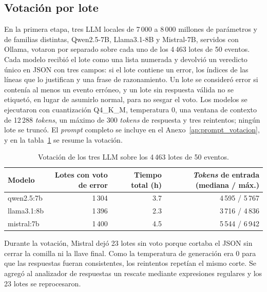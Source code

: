 
\subsection{Votación por lote}\label{subsec:met_votacion}

En la primera etapa, tres LLM locales de 7\,000 a 8\,000 millones de parámetros y de familias distintas, Qwen2.5-7B, Llama3.1-8B y Mistral-7B, servidos con Ollama, votaron por separado sobre cada uno de los 4\,463 lotes de 50 eventos. Cada modelo recibió el lote como una lista numerada y devolvió un veredicto único en JSON con tres campos: si el lote contiene un error, los índices de las líneas que lo justifican y una frase de razonamiento. Un lote se consideró error si contenía al menos un evento erróneo, y un lote sin respuesta válida no se etiquetó, en lugar de asumirlo normal, para no sesgar el voto. Los modelos se ejecutaron con cuantización Q4\_K\_M, temperatura 0, una ventana de contexto de 12\,288 \textit{tokens}, un máximo de 300 \textit{tokens} de respuesta y tres reintentos; ningún lote se truncó. El \textit{prompt} completo se incluye en el Anexo~\ref{ap:prompt_votacion}, y en la tabla~\ref{tab:met_votos} se resume la votación.

\begin{table}[H]
\centering
\caption{Votación de los tres LLM sobre los 4\,463 lotes de 50 eventos.}
\label{tab:met_votos}
\small
\begin{tabular}{@{}lrrr@{}}
\toprule
\textbf{Modelo} & \textbf{Lotes con voto de error} & \textbf{Tiempo total (h)} & \textbf{\textit{Tokens} de entrada (mediana / máx.)} \\
\midrule
qwen2.5:7b & 1\,304 & 3.7 & 4\,595 / 5\,767 \\
llama3.1:8b & 1\,396 & 2.3 & 3\,716 / 4\,836 \\
mistral:7b & 1\,400 & 4.5 & 5\,544 / 6\,942 \\
\bottomrule
\end{tabular}
\normalsize
\end{table}

Durante la votación, Mistral dejó 23 lotes sin voto porque cortaba el JSON sin cerrar la comilla ni la llave final. Como la temperatura de generación era 0 para que las respuestas fueran consistentes, los reintentos repetían el mismo corte. Se agregó al analizador de respuestas un rescate mediante expresiones regulares y los 23 lotes se reprocesaron.

